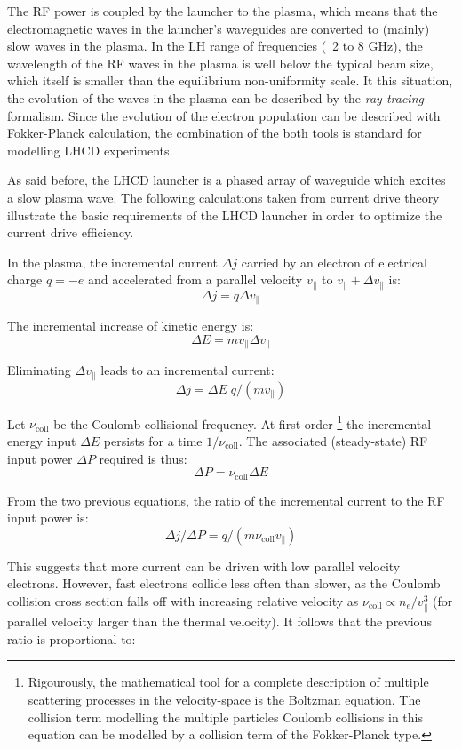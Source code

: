 The RF power is coupled by the launcher to the plasma, which means that the electromagnetic waves in the launcher’s waveguides are converted to (mainly) slow waves in the plasma. In the LH range of frequencies (~2 to 8 GHz), the wavelength of the RF waves in the plasma is well below the typical beam size, which itself is smaller than the equilibrium non-uniformity scale. It this situation, the evolution of the waves in the plasma can be described by the \emph{ray-tracing} formalism. Since the evolution of the electron population can be described with Fokker-Planck calculation, the combination of the both tools is standard for modelling LHCD experiments\parencite{Bonoli1982, Peysson2012}.

As said before, the LHCD launcher is a phased array of waveguide which excites a slow plasma wave. The following calculations taken from current drive theory illustrate the basic requirements of the LHCD launcher in order to optimize the current drive efficiency. 

In the plasma, the incremental current $\Delta j$ carried by an electron of electrical charge $q=-e$ and accelerated from a parallel velocity $v_\parallel$ to $v_\parallel + \Delta v_\parallel$ is:
$$\Delta j = q \Delta v_{\parallel}$$

The incremental increase of kinetic energy is:
$$\Delta E = m v_{\parallel} \Delta v_{\parallel}$$

Eliminating $\Delta v_{\parallel}$ leads to an incremental current: 
$$\Delta j = \Delta E \; q/(m v_{\parallel})$$ 

Let $\nu_\mathrm{coll}$ be the Coulomb collisional frequency. At first order \footnote{Rigourously, the mathematical tool for a complete description of multiple scattering processes in the velocity-space is the Boltzman equation. The collision term modelling the multiple particles Coulomb collisions in this equation can be modelled by a collision term of the Fokker-Planck type.} the incremental energy input $\Delta E$ persists for a time $1/\nu_\mathrm{coll}$. The associated (steady-state) RF input power $\Delta P$ required is thus: 
$$\Delta P = \nu_\mathrm{coll} \Delta E$$ 

From the two previous equations, the ratio of the incremental current to the RF input power is:
$$\Delta j/ \Delta P = q / (m \nu_\mathrm{coll} v_{\parallel})$$

This suggests that more current can be driven with low parallel velocity electrons. However, fast electrons collide less often than slower, as the Coulomb collision cross section falls off with increasing relative velocity as $\nu_\mathrm{coll} \propto n_e/v_{\parallel}^3$ (for parallel velocity larger than the thermal velocity). It follows that the previous ratio is proportional to: 

